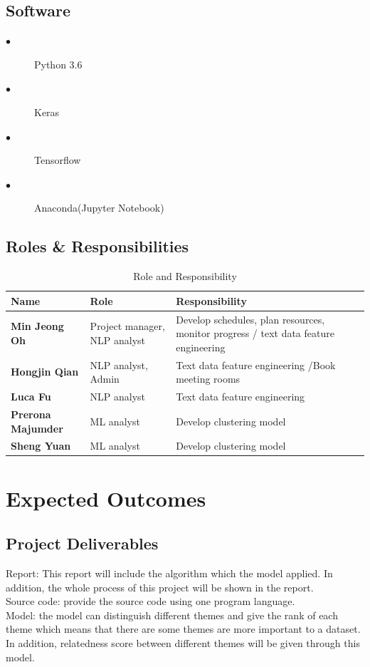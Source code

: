 \documentclass[12pt]{article}
\begin{document}
\subsection{Software}

\begin{description}
\item[$\bullet$ ] Python 3.6
\item[$\bullet$ ] Keras 
\item[$\bullet$ ] Tensorflow
\item[$\bullet$ ] Anaconda(Jupyter Notebook)
\end{description}
\subsection{Roles \& Responsibilities}
\begin{table}[H]
\centering
	 \begin{tabular}{ | p{4cm}<{\centering} | p{4cm}<{\centering}|p{4cm}<{\centering}|}
	\hline
	\textbf{Name} & \textbf{Role} & \textbf{Responsibility} 
	\\ \hline
	\textbf{Min Jeong Oh} & Project manager, NLP analyst & Develop schedules, plan resources, monitor progress / text data feature engineering 
\\ \hline
	\textbf{Hongjin Qian} & NLP analyst, Admin & Text data feature engineering /Book meeting rooms
	\\ \hline
	\textbf{Luca Fu} & NLP analyst & Text data feature engineering	
	\\ \hline
	\textbf{Prerona Majumder} & ML analyst & Develop clustering model
	\\ \hline
	\textbf{Sheng Yuan} & ML analyst & Develop clustering model
	\\ \hline
	\end{tabular}
	\caption{Role and Responsibility}
\end{table}

\section{Expected Outcomes}
\subsection{Project Deliverables}
Report: This report will include the algorithm which the model applied. In addition, the whole process of this project will be shown in the report.\\
Source code: provide the source code using one program language.\\
Model: the model can distinguish different themes and give the rank of each theme which means that there are some themes are more important to a dataset. In addition, relatedness score between different themes will be given through this model.\\
\end{document}

